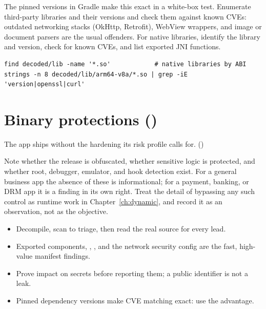The pinned versions in Gradle make this exact in a white-box test. Enumerate third-party libraries and their versions and check them against known CVEs: outdated networking stacks (OkHttp, Retrofit), WebView wrappers, and image or document parsers are the usual offenders. For native  libraries, identify the library and version, check for known CVEs, and list exported JNI functions.

\begin{lstlisting}
find decoded/lib -name '*.so'            # native libraries by ABI
strings -n 8 decoded/lib/arm64-v8a/*.so | grep -iE 'version|openssl|curl'
\end{lstlisting}

\section{Binary protections ()}
\begin{findingbox}
The app ships without the hardening its risk profile calls for. ()
\end{findingbox}
Note whether the release is obfuscated, whether sensitive logic is protected, and whether root, debugger, emulator, and hook detection exist. For a general business app the absence of these is informational; for a payment, banking, or DRM app it is a finding in its own right. Treat the detail of bypassing any such control as runtime work in Chapter~\ref{ch:dynamic}, and record it as an observation, not as the objective.

\begin{summarybox}
\begin{itemize}
\item Decompile, scan to triage, then read the real source for every lead.
\item Exported components, , , and the network security config are the fast, high-value manifest findings.
\item Prove impact on secrets before reporting them; a public identifier is not a leak.
\item Pinned dependency versions make CVE matching exact: use the advantage.
\end{itemize}
\end{summarybox}
